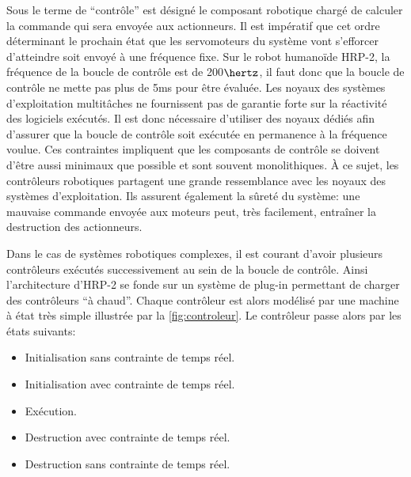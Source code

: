 Sous le terme de ``contrôle'' est désigné le composant robotique
chargé de calculer la commande qui sera envoyée aux actionneurs. Il
est impératif que cet ordre déterminant le prochain état que les
servomoteurs du système vont s'efforcer d'atteindre soit envoyé à une
fréquence fixe. Sur le robot humanoïde HRP-2, la
fréquence de la boucle de contrôle est de 200$\hertz$, il faut donc
que la boucle de contrôle ne mette pas plus de 5ms pour être
évaluée. Les noyaux des systèmes d'exploitation multitâches ne
fournissent pas de garantie forte sur la réactivité des logiciels
exécutés. Il est donc nécessaire d'utiliser des noyaux dédiés afin
d'assurer que la boucle de contrôle soit exécutée en permanence à la
fréquence voulue. Ces contraintes impliquent que les composants de
contrôle se doivent d'être aussi minimaux que possible et sont souvent
monolithiques. À ce sujet, les contrôleurs robotiques partagent une
grande ressemblance avec les noyaux des systèmes d'exploitation. Ils
assurent également la sûreté du système: une mauvaise commande envoyée
aux moteurs peut, très facilement, entraîner la destruction des
actionneurs.

Dans le cas de systèmes robotiques complexes, il est courant d'avoir
plusieurs contrôleurs exécutés successivement au sein de la boucle de
contrôle. Ainsi l'architecture d'HRP-2 se fonde sur un système de
plug-in permettant de charger des contrôleurs ``à chaud''. Chaque
contrôleur est alors modélisé par une machine à état très simple
illustrée par la \autoref{fig:controleur}. Le contrôleur passe alors
par les états suivants:

\begin{itemize}
\item Initialisation sans contrainte de temps réel.
\item Initialisation avec contrainte de temps réel.
\item Exécution.
\item Destruction avec contrainte de temps réel.
\item Destruction sans contrainte de temps réel.
\end{itemize}

